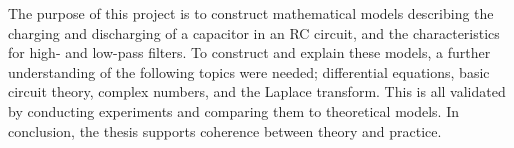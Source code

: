 The purpose of this project is to construct mathematical models describing the charging and discharging of a capacitor in an RC circuit, and the characteristics for high- and low-pass filters. To construct and explain these models, a further understanding of the following topics were needed; differential equations, basic circuit theory, complex numbers, and the Laplace transform. This is all validated by conducting experiments and comparing them to theoretical models. In conclusion, the thesis supports coherence between theory and practice. 